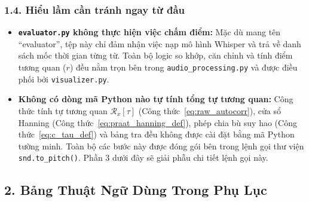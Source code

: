 \documentclass[11pt,a4paper]{article}
\begin{document}
\subsubsection*{1.4. Hiểu lầm cần tránh ngay từ đầu}
\begin{itemize}
    \setlength{\itemsep}{1.5pt}
    \item \textbf{\texttt{evaluator.py} không thực hiện việc chấm điểm:} Mặc dù mang tên ``evaluator'', tệp này chỉ đảm nhận việc nạp mô hình Whisper và trả về danh sách mốc thời gian từng từ. Toàn bộ logic so khớp, căn chỉnh và tính điểm tương quan ($r$) đều nằm trọn bên trong \texttt{audio\_processing.py} và được điều phối bởi \texttt{visualizer.py}.
    \item \textbf{Không có dòng mã Python nào tự tính tổng tự tương quan:} Công thức tính tự tương quan $\mathcal{R}_x[\tau]$ (Công thức~\eqref{eq:raw_autocorr}), cửa sổ Hanning (Công thức~\eqref{eq:praat_hanning_def}), phép chia bù suy hao (Công thức~\eqref{eq:c_tau_def}) và bảng tra đều không được cài đặt bằng mã Python tường minh. Toàn bộ các bước này được đóng gói bên trong lệnh gọi thư viện \texttt{snd.to\_pitch()}. Phần 3 dưới đây sẽ giải phẫu chi tiết lệnh gọi này.
\end{itemize}

\subsection*{2. Bảng Thuật Ngữ Dùng Trong Phụ Lục}
\end{document}
